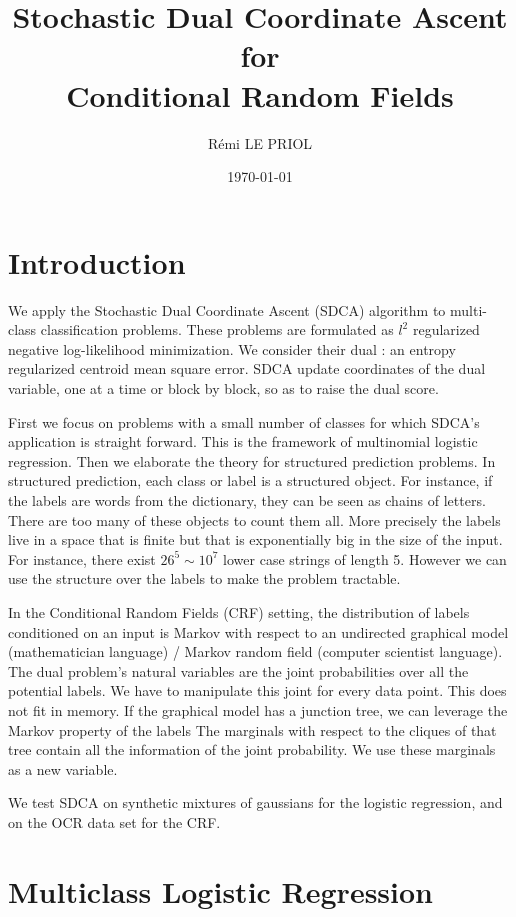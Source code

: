 \documentclass{article}
\title{Stochastic Dual Coordinate Ascent \\ for \\ Conditional Random Fields}
\author{R\'emi LE PRIOL}
\date{\today}
\DeclareMathOperator{\1}{\mathbb{1}}
\begin{document}
\maketitle

\section*{Introduction}

We apply the Stochastic Dual Coordinate Ascent (SDCA) algorithm to multi-class classification problems.
These problems are formulated as $l^2$ regularized negative log-likelihood minimization. 
We consider their dual : an entropy regularized centroid mean square error.
SDCA update coordinates of the dual variable, one at a time or block by block, so as to raise the dual score.
  
First we focus on problems with a small number of classes for which SDCA's application is straight forward.
This is the framework of multinomial logistic regression.
Then we elaborate the theory for structured prediction problems.
In structured prediction, each class or label is a structured object.
For instance, if the labels are words from the dictionary, they can be seen as chains of letters.
There are too many of these objects to count them all.
More precisely  the labels live in a space that is finite but that is exponentially big in the size of the input.
For instance, there exist $26^5 \sim 10^7$ lower case strings of length 5. 
However we can use the structure over the labels to make the problem tractable.

In the Conditional Random Fields (CRF) setting, the distribution of labels conditioned on an input is Markov with respect to an undirected graphical model (mathematician language) / Markov random field (computer scientist language). 
The dual problem's natural variables are the joint probabilities over all the potential labels.
We have to manipulate this joint for every data point.
This does not fit in memory.
If the graphical model has a junction tree, we can leverage the Markov property of the labels
The marginals with respect to the cliques of that tree contain all the information of the joint probability.
We use these marginals as a new variable.

We test SDCA on synthetic mixtures of gaussians for the logistic regression, and on the OCR data set for the CRF.

\tableofcontents

\section{Multiclass Logistic Regression}
\end{document}
